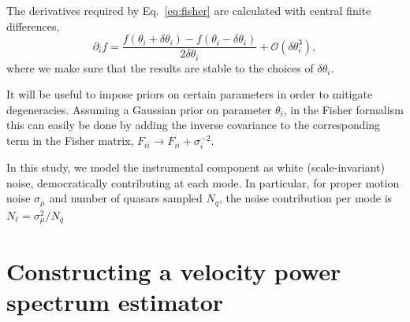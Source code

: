 \documentclass[twocolumn]{aastex63}
\newcommand{\SMS}[1]{{\bf \color{deepgreen}{[SM: #1]}}}
\begin{document}
The derivatives required by Eq.~\ref{eq:fisher} are calculated with central finite differences,
\begin{equation}
\partial_if = \frac{f(\theta_i + \delta\theta_i) - f(\theta_i - \delta\theta_i)}{2\delta\theta_i} + \mathcal{O}(\delta\theta_i^3),
\end{equation}
where we make sure that the results are stable to the choices of ${\delta\theta_i}$.

It will be useful to impose priors on certain parameters in order to mitigate degeneracies. Assuming a Gaussian prior on parameter $\theta_i$, in the Fisher formalism this can easily be done by adding the inverse covariance to the corresponding term in the Fisher matrix, $F_{ii} \rightarrow F_{ii} + \sigma_i^{-2}$.

In this study, we model the instrumental component as white (scale-invariant) noise, democratically contributing at each mode. In particular, for proper motion noise $\sigma_\mu$ and number of quasars sampled $N_q$, the noise contribution per mode is $N_\ell = \sigma_\mu^2/N_q$

\section{Constructing a velocity power spectrum estimator}

\SMS{Just copied this out from @kvt notes...}
\end{document}
